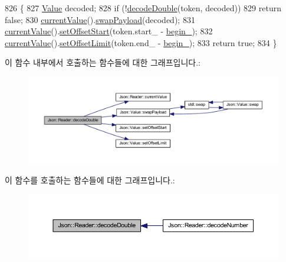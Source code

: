 \begin{DoxyCode}
826                                       \{
827   \hyperlink{class_json_1_1_value}{Value} decoded;
828   \textcolor{keywordflow}{if} (!\hyperlink{class_json_1_1_reader_a2420bbb7fd6d5d3e7e2fea894dd8f70f}{decodeDouble}(token, decoded))
829     \textcolor{keywordflow}{return} \textcolor{keyword}{false};
830   \hyperlink{class_json_1_1_reader_a85597f763fb0148a17359b6dfc6f7326}{currentValue}().\hyperlink{class_json_1_1_value_a5263476047f20e2fc6de470e4de34fe5}{swapPayload}(decoded);
831   \hyperlink{class_json_1_1_reader_a85597f763fb0148a17359b6dfc6f7326}{currentValue}().\hyperlink{class_json_1_1_value_a92e32ea0f4f8a15853a3cf0beac9feb9}{setOffsetStart}(token.start\_ - \hyperlink{class_json_1_1_reader_a327166839022ea91f0a8290960a8af76}{begin\_});
832   \hyperlink{class_json_1_1_reader_a85597f763fb0148a17359b6dfc6f7326}{currentValue}().\hyperlink{class_json_1_1_value_a5e4f5853fec138150c5df6004a8c2bcf}{setOffsetLimit}(token.end\_ - \hyperlink{class_json_1_1_reader_a327166839022ea91f0a8290960a8af76}{begin\_});
833   \textcolor{keywordflow}{return} \textcolor{keyword}{true};
834 \}
\end{DoxyCode}
이 함수 내부에서 호출하는 함수들에 대한 그래프입니다.\+:\nopagebreak
\begin{figure}[H]
\begin{center}
\leavevmode
\includegraphics[width=350pt]{class_json_1_1_reader_a2420bbb7fd6d5d3e7e2fea894dd8f70f_cgraph}
\end{center}
\end{figure}
이 함수를 호출하는 함수들에 대한 그래프입니다.\+:\nopagebreak
\begin{figure}[H]
\begin{center}
\leavevmode
\includegraphics[width=350pt]{class_json_1_1_reader_a2420bbb7fd6d5d3e7e2fea894dd8f70f_icgraph}
\end{center}
\end{figure}
\mbox{\label{class_json_1_1_reader_a5e4a66be7c413bca86078f14df5eb802}} 
